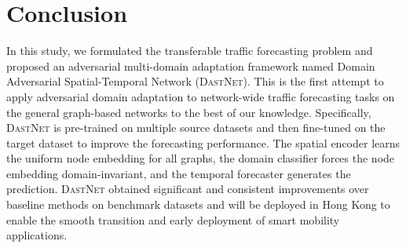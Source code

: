 \documentclass[sigconf]{acmart}
\theoremstyle{definition}
\begin{document}
\renewcommand{\arraystretch}{0.95}
\begin{table}[ht]
\setlength{\tabcolsep}{1pt}
\caption{Performance comparison on the newly collected data in Hong Kong.}
\centering
{}
\label{table:hkfull}
\end{table}



\section{Conclusion}\label{sec:conclusion}

In this study, we formulated the transferable traffic forecasting problem and proposed an adversarial multi-domain adaptation framework named Domain Adversarial Spatial-Temporal Network (\textsc{DastNet}). 
This is the first attempt to apply adversarial domain adaptation to network-wide traffic forecasting tasks on the general graph-based networks to the best of our knowledge. 
Specifically, \textsc{DastNet} is pre-trained on multiple source datasets and then fine-tuned on the target dataset to improve the forecasting performance. 
The spatial encoder learns the uniform node embedding for all graphs, the domain classifier forces the node embedding domain-invariant, and the temporal forecaster generates the prediction. 
\textsc{DastNet} obtained significant and consistent improvements over baseline methods on benchmark datasets and will be deployed in Hong Kong to enable the smooth transition and early deployment of smart mobility applications. 
\end{document}
